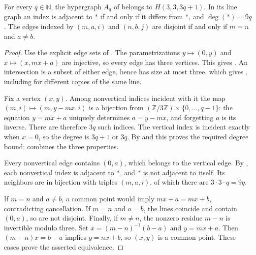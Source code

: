 \begin{lemma}
For every $q\in\mathbb N$, the hypergraph $A_q$ of
 belongs to $H(3,3,3q+1)$.
In its line graph an index is adjacent to $\ast$ if and only if it differs
from $\ast$, and $\deg(\ast)=9q$.
The edges indexed by $(m,a,i)$ and $(n,b,j)$ are disjoint if and only if
$m=n$ and $a\ne b$.
\end{lemma}
\begin{proof}
Use the explicit edge sets of .
The parametrizations $y\mapsto(0,y)$ and $x\mapsto(x,mx+a)$ are injective,
so every edge has three vertices. This gives .
An intersection is a subset of either edge, hence has size at most three,
which gives , including for different copies of
the same line.

Fix a vertex $(x,y)$. Among nonvertical indices incident with it the map
$(m,i)\mapsto(m,y-mx,i)$ is a bijection from
$(\mathbb Z/3\mathbb Z)\times\{0,\ldots,q-1\}$: the equation
$y=mx+a$ uniquely determines $a=y-mx$, and forgetting $a$ is its inverse.
There are therefore $3q$ such indices. The vertical index is incident
exactly when $x=0$, so the degree is $3q+1$ or $3q$.
By  and  this proves
the required degree bound;  combines the three properties.

Every nonvertical edge contains $(0,a)$, which belongs to the vertical
edge. By , each nonvertical index is adjacent
to $\ast$, and $\ast$ is not adjacent to itself. Its neighbors are in
bijection with triples $(m,a,i)$, of which there are $3\cdot3\cdot q=9q$.

If $m=n$ and $a\ne b$, a common point would imply $mx+a=mx+b$,
contradicting cancellation. If $m=n$ and $a=b$, the lines coincide and
contain $(0,a)$, so are not disjoint. Finally, if $m\ne n$, the nonzero
residue $m-n$ is invertible modulo three. Set $x=(m-n)^{-1}(b-a)$
and $y=mx+a$. Then $(m-n)x=b-a$ implies $y=nx+b$, so $(x,y)$
is a common point. These cases prove the asserted equivalence.
\end{proof}
